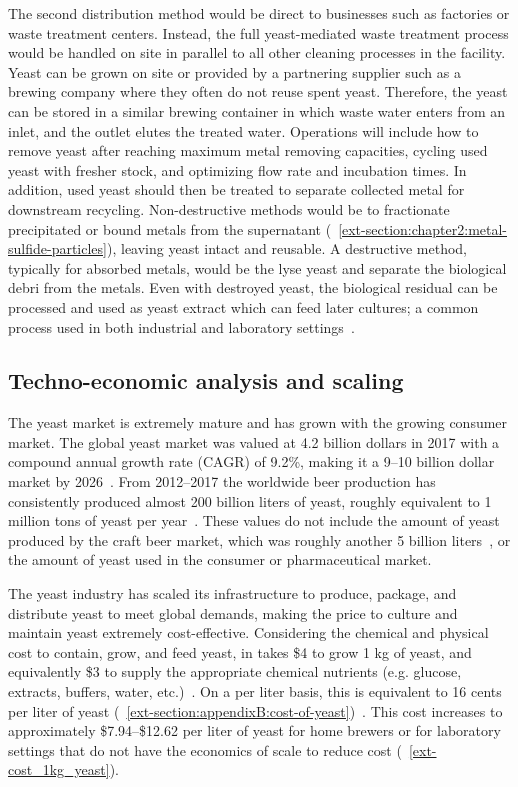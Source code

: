 \documentclass[../main/main]{subfiles}
\begin{document}
The second distribution method would be direct to businesses such as factories or waste treatment centers. Instead, the full yeast-mediated waste treatment process would be handled on site in parallel to all other cleaning processes in the facility. Yeast can be grown on site or provided by a partnering supplier such as a brewing company where they often do not reuse spent yeast. Therefore, the yeast can be stored in a similar brewing container in which waste water enters from an inlet, and the outlet elutes the treated water. Operations will include how to remove yeast after reaching maximum metal removing capacities, cycling used yeast with fresher stock, and optimizing flow rate and incubation times. In addition, used yeast should then be treated to separate collected metal for downstream recycling. Non-destructive methods would be to fractionate precipitated or bound metals from the supernatant (\CHAPTER~\ref{ext-section:chapter2:metal-sulfide-particles}), leaving yeast intact and reusable. A destructive method, typically for absorbed metals, would be the lyse yeast and separate the biological debri from the metals. Even with destroyed yeast, the biological residual can be processed and used as yeast extract which can feed later cultures; a common process used in both industrial and laboratory settings~\cite{greig2009}.

\subsection{Techno-economic analysis and scaling}
\label{subsection:chapter5:economics}
The yeast market is extremely mature and has grown with the growing consumer market. The global yeast market was valued at 4.2 billion dollars in 2017 with a compound annual growth rate (CAGR) of 9.2\%, making it a 9--10 billion dollar market by 2026~\cite{prnewswire.n.d.}. From 2012--2017 the worldwide beer production has consistently produced almost 200 billion liters of yeast, roughly equivalent to 1 million tons of yeast per year~\cite{thierrygodard2018,barth-haasgroup.2019}. These values do not include the amount of yeast produced by the craft beer market, which was roughly another 5 billion liters~\cite{demetergroup.n.d.2014}, or the amount of yeast used in the consumer or pharmaceutical market.

The yeast industry has scaled its infrastructure to produce, package, and distribute yeast to meet global demands, making the price to culture and maintain yeast extremely cost-effective. Considering the chemical and physical cost to contain, grow, and feed yeast, in takes \$4 to grow 1 kg of yeast, and equivalently \$3 to supply the appropriate chemical nutrients (e.g. glucose, extracts, buffers, water, etc.)~\cite{harrison2015}. On a per liter basis, this is equivalent to 16 cents per liter of yeast (\APPENDIX~\ref{ext-section:appendixB:cost-of-yeast})~\cite{harrison2015}.
This cost increases to approximately \$7.94--\$12.62 per liter of yeast for home brewers or for laboratory settings that do not have the economics of scale to reduce cost (\TABLE~\ref{ext-cost_1kg_yeast}).
\end{document}
